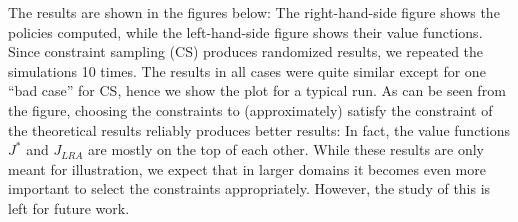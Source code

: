 \documentclass[twocolumn]{IEEEtran}
\begin{document}
\begin{comment}
\emph{Case (ii)}: In a manner similar to \emph{Case (i)}, here too we formulate two separate LRALPs for next states. When formulating the LRALP for state $s'$, we first let $c_{s'}(s)=(1-\alpha)(\alpha)^{|s'-s|}$ and normalize $c$ and sample $m=6$ constraints randomly using $c$ and compute $\hat{J}_{c_s'}$. Since the optimal sampling distribution is unknown, we sample from $c$ which assigns higher weights to nearby states.
The lookahead policy is formulated as
$u_{CS}(s)=\argmin_{a\in A} g_a(s)+\sum_{s'\in S}p_a(s,s')\hat{J}_{c_{s'}}(s')$.
\end{comment}
The results are shown in the figures below: The right-hand-side figure shows the policies computed,
while the left-hand-side figure shows their value functions.
Since constraint sampling (CS) produces randomized results,
we repeated the simulations 10 times.
The results in all cases were quite similar except for one ``bad case'' for CS, hence we show the plot for a typical run.
As can be seen from the figure, choosing the constraints to (approximately) satisfy the constraint of the theoretical results
reliably produces better results: In fact, the value functions $J^*$ and $J_{LRA}$ are mostly on the top of each other.
While these results are only meant for illustration,
we expect that in larger domains it becomes even more important to select the constraints appropriately.
However, the study of this is left for future work.
\begin{figure}[htp]
\begin{minipage}{0.5\textwidth}
\end{minipage}
\end{figure}
\end{document}

